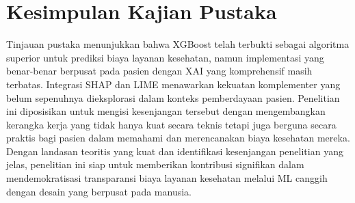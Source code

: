 \section{Kesimpulan Kajian Pustaka}
Tinjauan pustaka menunjukkan bahwa XGBoost telah terbukti sebagai algoritma superior untuk prediksi biaya layanan kesehatan, namun implementasi yang benar-benar berpusat pada pasien dengan XAI yang komprehensif masih terbatas. Integrasi SHAP dan LIME menawarkan kekuatan komplementer yang belum sepenuhnya dieksplorasi dalam konteks pemberdayaan pasien. Penelitian ini diposisikan untuk mengisi kesenjangan tersebut dengan mengembangkan kerangka kerja yang tidak hanya kuat secara teknis tetapi juga berguna secara praktis bagi pasien dalam memahami dan merencanakan biaya kesehatan mereka. Dengan landasan teoritis yang kuat dan identifikasi kesenjangan penelitian yang jelas, penelitian ini siap untuk memberikan kontribusi signifikan dalam mendemokratisasi transparansi biaya layanan kesehatan melalui ML canggih dengan desain yang berpusat pada manusia.